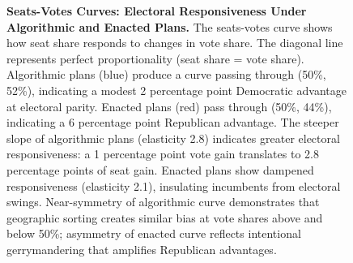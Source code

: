 \begin{figure}[htbp]
\caption{\textbf{Seats-Votes Curves: Electoral Responsiveness Under Algorithmic and Enacted Plans.}
The seats-votes curve shows how seat share responds to changes in vote share. The diagonal line represents perfect proportionality (seat share = vote share). Algorithmic plans (blue) produce a curve passing through (50\%, 52\%), indicating a modest 2 percentage point Democratic advantage at electoral parity. Enacted plans (red) pass through (50\%, 44\%), indicating a 6 percentage point Republican advantage. The steeper slope of algorithmic plans (elasticity 2.8) indicates greater electoral responsiveness: a 1 percentage point vote gain translates to 2.8 percentage points of seat gain. Enacted plans show dampened responsiveness (elasticity 2.1), insulating incumbents from electoral swings. Near-symmetry of algorithmic curve demonstrates that geographic sorting creates similar bias at vote shares above and below 50\%; asymmetry of enacted curve reflects intentional gerrymandering that amplifies Republican advantages.}
\label{fig:seats-votes-curves}
\end{figure}
